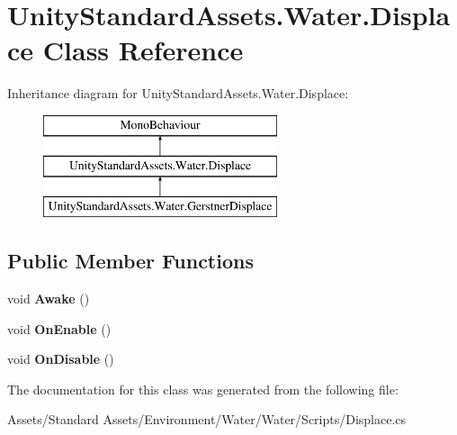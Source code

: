 \hypertarget{class_unity_standard_assets_1_1_water_1_1_displace}{}\section{Unity\+Standard\+Assets.\+Water.\+Displace Class Reference}
\label{class_unity_standard_assets_1_1_water_1_1_displace}
Inheritance diagram for Unity\+Standard\+Assets.\+Water.\+Displace\+:\begin{figure}[H]
\begin{center}
\leavevmode
\includegraphics[height=3.000000cm]{class_unity_standard_assets_1_1_water_1_1_displace}
\end{center}
\end{figure}
\subsection*{Public Member Functions}
\begin{DoxyCompactItemize}
\item 
void {\bfseries Awake} ()\hypertarget{class_unity_standard_assets_1_1_water_1_1_displace_acf1e38d869a1c847ba7600e4ca57602d}{}\label{class_unity_standard_assets_1_1_water_1_1_displace_acf1e38d869a1c847ba7600e4ca57602d}

\item 
void {\bfseries On\+Enable} ()\hypertarget{class_unity_standard_assets_1_1_water_1_1_displace_aae897c2c43a2a0a34872e70d67f9ead2}{}\label{class_unity_standard_assets_1_1_water_1_1_displace_aae897c2c43a2a0a34872e70d67f9ead2}

\item 
void {\bfseries On\+Disable} ()\hypertarget{class_unity_standard_assets_1_1_water_1_1_displace_a943603120ed56993ad8e75fa20d38b44}{}\label{class_unity_standard_assets_1_1_water_1_1_displace_a943603120ed56993ad8e75fa20d38b44}

\end{DoxyCompactItemize}


The documentation for this class was generated from the following file\+:\begin{DoxyCompactItemize}
\item 
Assets/\+Standard Assets/\+Environment/\+Water/\+Water/\+Scripts/Displace.\+cs\end{DoxyCompactItemize}
